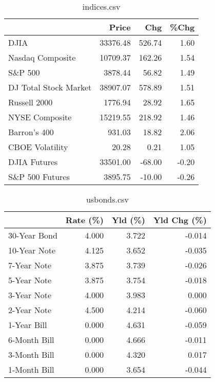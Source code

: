 \documentclass{article}%
\begin{document}
%


\begin{table}[htbp]%
\caption{indices.csv}%
\centering%
\begin{adjustbox}{width=1\textwidth}%
\begin{tabular}{lrrr}
\toprule
                      &    Price &    Chg &  \%Chg \\
\midrule
                 DJIA & 33376.48 & 526.74 &  1.60 \\
     Nasdaq Composite & 10709.37 & 162.26 &  1.54 \\
              S\&P 500 &  3878.44 &  56.82 &  1.49 \\
DJ Total Stock Market & 38907.07 & 578.89 &  1.51 \\
         Russell 2000 &  1776.94 &  28.92 &  1.65 \\
       NYSE Composite & 15219.55 & 218.92 &  1.46 \\
         Barron's 400 &   931.03 &  18.82 &  2.06 \\
      CBOE Volatility &    20.28 &   0.21 &  1.05 \\
         DJIA Futures & 33501.00 & -68.00 & -0.20 \\
      S\&P 500 Futures &  3895.75 & -10.00 & -0.26 \\
\bottomrule
\end{tabular}
%
\end{adjustbox}%
\end{table}

%


\begin{table}[htbp]%
\caption{usbonds.csv}%
\centering%
\begin{adjustbox}{width=1\textwidth}%
\begin{tabular}{lrrr}
\toprule
             &  Rate (\%) &  Yld (\%) &  Yld Chg (\%) \\
\midrule
30-Year Bond &     4.000 &    3.722 &       -0.014 \\
10-Year Note &     4.125 &    3.652 &       -0.035 \\
 7-Year Note &     3.875 &    3.739 &       -0.026 \\
 5-Year Note &     3.875 &    3.754 &       -0.018 \\
 3-Year Note &     4.000 &    3.983 &        0.000 \\
 2-Year Note &     4.500 &    4.214 &       -0.060 \\
 1-Year Bill &     0.000 &    4.631 &       -0.059 \\
6-Month Bill &     0.000 &    4.666 &       -0.011 \\
3-Month Bill &     0.000 &    4.320 &        0.017 \\
1-Month Bill &     0.000 &    3.654 &       -0.044 \\
\bottomrule
\end{tabular}
%
\end{adjustbox}%
\end{table}
\end{document}

